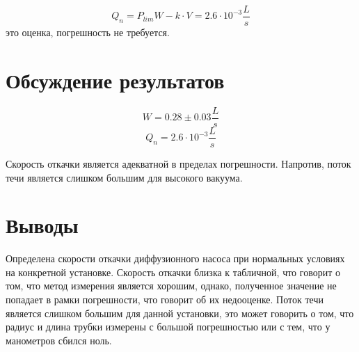\documentclass[a4paper,12pt]{article} %
\begin{document}
\begin{equation}
    Q_{n} = P_{lim}W - k \cdot V = 2.6 \cdot 10^{-3} \frac{L}{s}
\end{equation}
это оценка, погрешность не требуется.

\section{Обсуждение результатов}

\begin{equation*}
    W = 0.28 \pm 0.03 \frac{L}{s}
\end{equation*}
\begin{equation}
    Q_{n} = 2.6 \cdot 10^{-3} \frac{L}{s}
\end{equation}

Скорость откачки является адекватной в пределах погрешности. Напротив, поток течи является слишком большим для высокого вакуума.
\section{Выводы}
Определена скорости откачки диффузионного насоса при нормальных условиях на конкретной установке. Скорость откачки близка к табличной, что говорит о том, что метод измерения является хорошим, однако, полученное значение не попадает в рамки погрешности, что говорит об их недооценке. Поток течи является слишком большим для данной установки, это может говорить о том, что радиус и длина трубки измерены с большой погрешностью или с тем, что у манометров сбился ноль.
\end{document}
